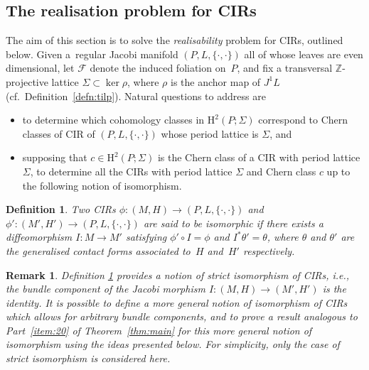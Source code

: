 \documentclass[10pt,a4paper]{amsart}
\numberwithin{equation}{section}
\newtheorem{Definition}[Theorem]{Definition}
\newtheorem{Remark}[Theorem]{Remark} }
\newcommand{\JM}{(P,L,\{\cdot,\cdot\})} %
\newcommand{\CM}{(M,H)} %
\newcommand{\HH}{\mathrm{H}}
\newcommand{\ZZ}{\mathbb{Z}}
\begin{document}
\subsection{The realisation problem for CIRs}\label{sec:class-cir-over}
The aim of this section is to solve the {\em realisability} problem for CIRs, outlined below. Given a~regular Jacobi manifold $\JM$ all of whose leaves are even dimensional, let $\mathcal{F}$ denote the induced foliation on~$P$, and f\/ix a transversal $\ZZ$-projective lattice $\Sigma \subset \ker \rho$, where $\rho$ is the anchor map of $J^1L$ (cf.\ Def\/inition~\ref{defn:tilp}). Natural questions to address are
\begin{itemize}\itemsep=0pt
\item to determine which cohomology classes in $\HH^2(P;\Sigma)$ correspond to Chern classes of CIR of $\JM$ whose period lattice is $\Sigma$, and
\item supposing that $c \in \HH^2(P;\Sigma)$ is the Chern class of a CIR with period lattice $\Sigma$, to determine all the CIRs with period lattice $\Sigma$ and Chern class $c$ up to the following notion of isomorphism.
\end{itemize}

\begin{Definition}\label{defn:iso_cir}
Two CIRs $\phi \colon \CM \to \JM$ and $\phi'\colon (M',H') \to \JM$ are said to be {\em isomorphic} if there exists a dif\/feomorphism $I\colon M \to M'$ satisfying $\phi'\circ I = \phi$ and $I^* \theta' = \theta$, where $\theta$ and $\theta'$ are the generalised contact forms associated to~$H$ and~$H'$ respectively.
\end{Definition}

\begin{Remark}\label{rk:strict} Def\/inition \ref{defn:iso_cir} provides a notion of {\em strict} isomorphism of CIRs, i.e., the bundle component of the Jacobi morphism $I \colon \CM \to (M',H')$ is the identity. It is possible to def\/ine a more general notion of isomorphism of CIRs which allows for arbitrary bundle components, and to prove a result analogous to Part~\ref{item:20} of Theorem~\ref{thm:main} for this more general notion of isomorphism using the ideas presented below. For simplicity, only the case of strict isomorphism is considered here.
\end{Remark}
\end{document}
